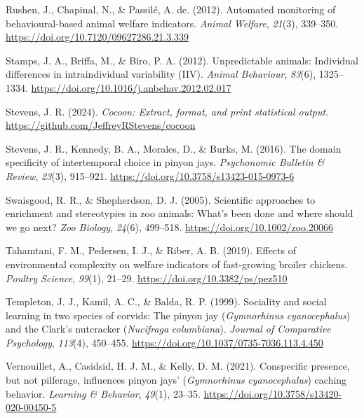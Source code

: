 \documentclass[
  pub]{apa6}
\newlength{\cslhangindent}
\newenvironment{CSLReferences}[2] %
 {\begin{list}{}{%
  \setlength{\itemindent}{0pt}
  \setlength{\leftmargin}{0pt}
  \setlength{\parsep}{0pt}
  \ifodd #1
   \setlength{\leftmargin}{\cslhangindent}
   \setlength{\itemindent}{-1\cslhangindent}
  \fi
  \setlength{\itemsep}{#2\baselineskip}}}
 {\end{list}}
\begin{document}
\begin{CSLReferences}{1}{0}
Rushen, J., Chapinal, N., \& Passilé, A. de. (2012). Automated monitoring of behavioural-based animal welfare indicators. \emph{Animal Welfare}, \emph{21}(3), 339--350. \url{https://doi.org/10.7120/09627286.21.3.339}

Stamps, J. A., Briffa, M., \& Biro, P. A. (2012). Unpredictable animals: Individual differences in intraindividual variability ({IIV}). \emph{Animal Behaviour}, \emph{83}(6), 1325--1334. \url{https://doi.org/10.1016/j.anbehav.2012.02.017}

Stevens, J. R. (2024). \emph{Cocoon: Extract, format, and print statistical output}. \url{https://github.com/JeffreyRStevens/cocoon}

Stevens, J. R., Kennedy, B. A., Morales, D., \& Burks, M. (2016). The domain specificity of intertemporal choice in pinyon jays. \emph{Psychonomic Bulletin \& Review}, \emph{23}(3), 915--921. \url{https://doi.org/10.3758/s13423-015-0973-6}

Swaisgood, R. R., \& Shepherdson, D. J. (2005). Scientific approaches to enrichment and stereotypies in zoo animals: What's been done and where should we go next? \emph{Zoo Biology}, \emph{24}(6), 499--518. \url{https://doi.org/10.1002/zoo.20066}

Tahamtani, F. M., Pedersen, I. J., \& Riber, A. B. (2019). Effects of environmental complexity on welfare indicators of fast-growing broiler chickens. \emph{Poultry Science}, \emph{99}(1), 21--29. \url{https://doi.org/10.3382/ps/pez510}

Templeton, J. J., Kamil, A. C., \& Balda, R. P. (1999). Sociality and social learning in two species of corvids: The pinyon jay ({\emph{Gymnorhinus}}{ \emph{cyanocephalus}}) and the {Clark}'s nutcracker ({\emph{Nucifraga}}{ \emph{columbiana}}). \emph{Journal of Comparative Psychology}, \emph{113}(4), 450--455. \url{https://doi.org/10.1037/0735-7036.113.4.450}

Vernouillet, A., Casidsid, H. J. M., \& Kelly, D. M. (2021). Conspecific presence, but not pilferage, influences pinyon jays' ({\emph{Gymnorhinus}}{ \emph{cyanocephalus}}) caching behavior. \emph{Learning \& Behavior}, \emph{49}(1), 23--35. \url{https://doi.org/10.3758/s13420-020-00450-5}


\end{CSLReferences}
\end{document}
